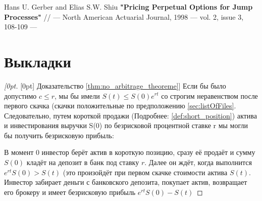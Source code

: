 \documentclass[a4paper,12pt]{article}
\theoremstyle{definition}
\newenvironment{delayedproof}[1]
 {\begin{proof}[\raisedtarget{#1}Доказательство \autoref{#1}]}
 {\end{proof}}
\newcommand{\raisedtarget}[1]{%
  \raisebox{\fontcharht\font`P}[0pt][0pt]{\hypertarget{#1}{}}%
}
\begin{document}
\begin{thebibliography}{3}
Hans U. Gerber and Elias S.W. Shiu \textbf{"Pricing Perpetual Options for Jump Processes"} // --- North American Actuarial Journal, 1998 --- vol. 2, issue 3, 108-109 ---
\end{thebibliography}

\appendix
\section{Выкладки}
\begin{delayedproof}{thm:no_arbitrage_theoreme} 
Если бы было допустимо $c \le r$, мы бы имели $S(t) \le S(0)e^{rt}$ со строгим неравенством после первого скачка (скачки положительные по предположению \ref{sec:listOfFiles}. Следовательно, путем короткой продажи (Подробнее: \autoref{def:short_position}) актива и инвестирования выручки S(0) по безрисковой процентной ставке r мы могли бы получить безрисковую прибыль:

В момент 0 инвестор берёт актив в короткую позицию, сразу её продаёт и сумму $S(0)$ кладёт на депозит в банк под ставку $r$. Далее он ждёт, когда выполнится $e^{rt} S(0) > S(t)$ (это произойдёт при первом скачке стоимости актива $S(t)$. Инвестор забирает деньги с банковского депозита, покупает актив, возвращает его брокеру и имеет безрисковую прибыль $e^{rt}S(0) - S(t)$
\end{delayedproof}
\end{document}
